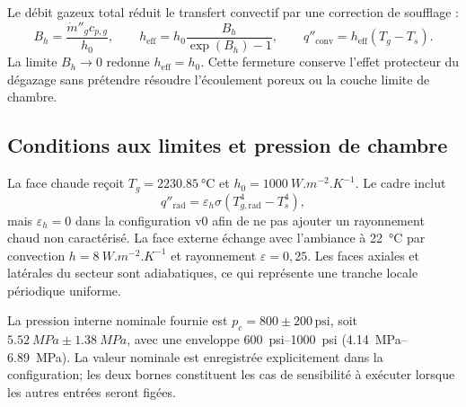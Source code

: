 \documentclass[oneside,openany]{amsdtx}
\begin{document}
Le débit gazeux total réduit le transfert convectif par une correction de
soufflage :
\begin{equation}
 B_h=\frac{\dot m''_g c_{p,g}}{h_0},\qquad
 h_{\mathrm{eff}}=h_0\frac{B_h}{\exp(B_h)-1},\qquad
 q''_{\mathrm{conv}}=h_{\mathrm{eff}}(T_g-T_s).
 \label{eq:v0-blowing}
\end{equation}
La limite \(B_h\rightarrow0\) redonne \(h_{\mathrm{eff}}=h_0\). Cette
fermeture conserve l'effet protecteur du dégazage sans prétendre résoudre
l'écoulement poreux ou la couche limite de chambre.

\subsection{Conditions aux limites et pression de chambre}
La face chaude reçoit \(T_g=\SI{2230.85}{\degreeCelsius}\) et
\(h_0=\SI{1000}{W.m^{-2}.K^{-1}}\). Le cadre inclut
\begin{equation}
 q''_{\mathrm{rad}}=\varepsilon_h\sigma
 \left(T_{g,\mathrm{rad}}^4-T_s^4\right),
\end{equation}
mais \(\varepsilon_h=0\) dans la configuration v0 afin de ne pas ajouter un
rayonnement chaud non caractérisé. La face externe échange avec l'ambiance à
\SI{22}{\degreeCelsius} par convection
\(h=\SI{8}{W.m^{-2}.K^{-1}}\) et rayonnement
\(\varepsilon=0{,}25\). Les faces axiales et latérales du secteur sont
adiabatiques, ce qui représente une tranche locale périodique uniforme.

La pression interne nominale fournie est
\(p_c=800\pm200\,\mathrm{psi}\), soit
\(\SI{5.52}{MPa}\pm\SI{1.38}{MPa}\), avec une enveloppe
\SIrange{600}{1000}{psi} (\SIrange{4.14}{6.89}{MPa}). La valeur nominale est
enregistrée explicitement dans la configuration; les deux bornes constituent
les cas de sensibilité à exécuter lorsque les autres entrées seront figées.
\end{document}
